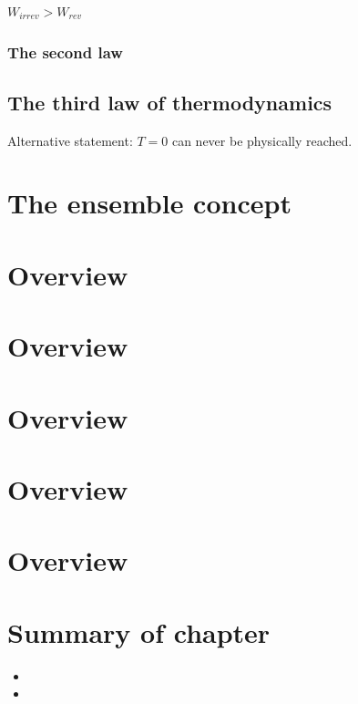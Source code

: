 $W_{irrev}>W_{rev}$

\subsubsection{The second law}


\subsection{The third law of thermodynamics}

Alternative statement: $T=0$ can never be physically reached.


\section{The ensemble concept}





\section{Overview}
\section{Overview}
\section{Overview}
\section{Overview}
\section{Overview}

\section*{Summary of chapter}

\begin{itemize}
	\item 
	\item 
\end{itemize}